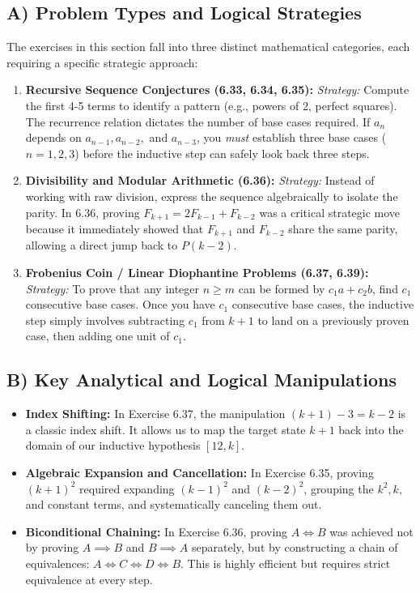 \documentclass[11pt, a4paper]{article}
\theoremstyle{definition}
\theoremstyle{remark}
\begin{document}
\subsection{A) Problem Types and Logical Strategies}
The exercises in this section fall into three distinct mathematical categories, each requiring a specific strategic approach:
\begin{enumerate}
    \item \textbf{Recursive Sequence Conjectures (6.33, 6.34, 6.35):} 
    \textit{Strategy:} Compute the first 4-5 terms to identify a pattern (e.g., powers of 2, perfect squares). The recurrence relation dictates the number of base cases required. If $a_n$ depends on $a_{n-1}, a_{n-2},$ and $a_{n-3}$, you \textit{must} establish three base cases ($n=1, 2, 3$) before the inductive step can safely look back three steps.
    \item \textbf{Divisibility and Modular Arithmetic (6.36):} 
    \textit{Strategy:} Instead of working with raw division, express the sequence algebraically to isolate the parity. In 6.36, proving $F_{k+1} = 2F_{k-1} + F_{k-2}$ was a critical strategic move because it immediately showed that $F_{k+1}$ and $F_{k-2}$ share the same parity, allowing a direct jump back to $P(k-2)$.
    \item \textbf{Frobenius Coin / Linear Diophantine Problems (6.37, 6.39):} 
    \textit{Strategy:} To prove that any integer $n \ge m$ can be formed by $c_1 a + c_2 b$, find $c_1$ consecutive base cases. Once you have $c_1$ consecutive base cases, the inductive step simply involves subtracting $c_1$ from $k+1$ to land on a previously proven case, then adding one unit of $c_1$.
\end{enumerate}

\subsection{B) Key Analytical and Logical Manipulations}
\begin{itemize}
    \item \textbf{Index Shifting:} In Exercise 6.37, the manipulation $(k+1) - 3 = k-2$ is a classic index shift. It allows us to map the target state $k+1$ back into the domain of our inductive hypothesis $[12, k]$.
    \item \textbf{Algebraic Expansion and Cancellation:} In Exercise 6.35, proving $(k+1)^2$ required expanding $(k-1)^2$ and $(k-2)^2$, grouping the $k^2, k,$ and constant terms, and systematically canceling them out. 
    \item \textbf{Biconditional Chaining:} In Exercise 6.36, proving $A \iff B$ was achieved not by proving $A \implies B$ and $B \implies A$ separately, but by constructing a chain of equivalences: $A \iff C \iff D \iff B$. This is highly efficient but requires strict equivalence at every step.
\end{itemize}
\end{document}
